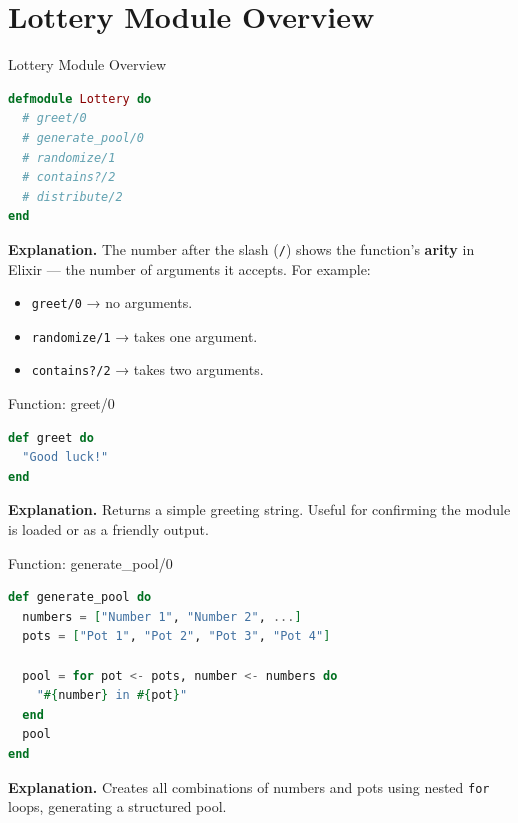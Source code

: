 \documentclass[aspectratio=169, table]{beamer}
\begin{document}
\section{Lottery Module Overview}
\begin{frame}[fragile]{Lottery Module Overview}
\vspace{20pt}
\begin{lstlisting}[language=Elixir]
defmodule Lottery do
  # greet/0
  # generate_pool/0
  # randomize/1
  # contains?/2
  # distribute/2
end
\end{lstlisting}

\textbf{Explanation.}  
The number after the slash (\texttt{/}) shows the function’s  
\textbf{arity} in Elixir — the number of arguments it accepts.  
For example:  
\begin{itemize}
  \item \texttt{greet/0} → no arguments.  
  \item \texttt{randomize/1} → takes one argument.  
  \item \texttt{contains?/2} → takes two arguments.  
\end{itemize}
\end{frame}



\begin{frame}[fragile]{Function: greet/0}
\vspace{20pt}
\begin{lstlisting}[language=Elixir]
def greet do
  "Good luck!"
end
\end{lstlisting}

\textbf{Explanation.}  
Returns a simple greeting string. Useful for confirming  
the module is loaded or as a friendly output.  
\end{frame}

\begin{frame}[fragile]{Function: generate\_pool/0}
\vspace{20pt}
\begin{lstlisting}[language=Elixir]
def generate_pool do
  numbers = ["Number 1", "Number 2", ...]
  pots = ["Pot 1", "Pot 2", "Pot 3", "Pot 4"]

  pool = for pot <- pots, number <- numbers do
    "#{number} in #{pot}"
  end
  pool
end
\end{lstlisting}

\textbf{Explanation.}  
Creates all combinations of numbers and pots using  
nested \texttt{for} loops, generating a structured pool.  
\end{frame}
\end{document}
